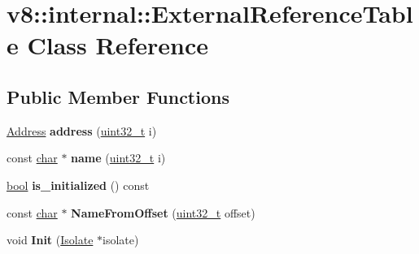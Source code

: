 \hypertarget{classv8_1_1internal_1_1ExternalReferenceTable}{}\section{v8\+:\+:internal\+:\+:External\+Reference\+Table Class Reference}
\label{classv8_1_1internal_1_1ExternalReferenceTable}
\subsection*{Public Member Functions}
\begin{DoxyCompactItemize}
\item 
\mbox{\label{classv8_1_1internal_1_1ExternalReferenceTable_a629e91d241dd2fa7a06701c3de1a3ca8}} 
\mbox{\hyperlink{classuintptr__t}{Address}} {\bfseries address} (\mbox{\hyperlink{classuint32__t}{uint32\+\_\+t}} i)
\item 
\mbox{\label{classv8_1_1internal_1_1ExternalReferenceTable_a0e6a1664fb4787375ab2aa7051dd47e8}} 
const \mbox{\hyperlink{classchar}{char}} $\ast$ {\bfseries name} (\mbox{\hyperlink{classuint32__t}{uint32\+\_\+t}} i)
\item 
\mbox{\label{classv8_1_1internal_1_1ExternalReferenceTable_a6775c26ee16efe78c7b9865d2be8e81f}} 
\mbox{\hyperlink{classbool}{bool}} {\bfseries is\+\_\+initialized} () const
\item 
\mbox{\label{classv8_1_1internal_1_1ExternalReferenceTable_adc6a6b69ce956c123dd8f267a98dc543}} 
const \mbox{\hyperlink{classchar}{char}} $\ast$ {\bfseries Name\+From\+Offset} (\mbox{\hyperlink{classuint32__t}{uint32\+\_\+t}} offset)
\item 
\mbox{\label{classv8_1_1internal_1_1ExternalReferenceTable_a3ae8697e6bfb31ea27d5245b5c13bb79}} 
void {\bfseries Init} (\mbox{\hyperlink{classv8_1_1internal_1_1Isolate}{Isolate}} $\ast$isolate)
\end{DoxyCompactItemize}
